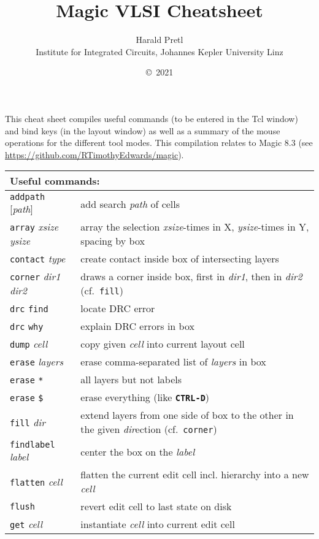 \documentclass[10pt,a4paper]{article}
\author{Harald Pretl\\Institute for Integrated Circuits, Johannes Kepler University Linz}
\title{Magic VLSI Cheatsheet}
\date{\copyright~2021}
\newcommand{\key}[1]{\texttt{\textbf{#1}}}
\newcommand{\mac}[1]{\texttt{#1}}
\newcommand{\argu}[1]{\textit{#1}}
\begin{document}
	\maketitle
	
	This cheat sheet compiles useful commands (to be entered in the Tcl window) and bind keys (in the layout window) as well as a summary of the mouse operations for the different tool modes. This compilation relates to Magic 8.3 (see \url{https://github.com/RTimothyEdwards/magic}).
	
	\newpage

	\begin{tabular}{p{}p{}}
		\toprule
		\multicolumn{2}{l}{Useful commands:}\\
		\midrule
		\mac{addpath} [\argu{path}] & add search \argu{path} of cells\\
		\mac{array} \argu{xsize} \argu{ysize} & array the selection \argu{xsize}-times in X, \argu{ysize}-times in Y, spacing by box\\
		\mac{contact} \argu{type} & create contact inside box of intersecting layers\\
		\mac{corner} \argu{dir1} \argu{dir2} & draws a corner inside box, first in \argu{dir1}, then in \argu{dir2} (cf.~\mac{fill})\\
		\mac{drc} \mac{find} & locate DRC error\\
		\mac{drc} \mac{why} & explain DRC errors in box\\
		\mac{dump} \argu{cell} & copy given \argu{cell} into current layout cell\\
		\mac{erase} \argu{layers} & erase comma-separated list of \argu{layers} in box\\
		\mac{erase} \mac{*} & all layers but not labels\\
		\mac{erase} \mac{\$} & erase everything (like \key{CTRL-D})\\
		\mac{fill} \argu{dir} & extend layers from one side of box to the other in the given \argu{dir}ection (cf.~\mac{corner})\\
		\mac{findlabel} \argu{label} & center the box on the \argu{label}\\
		\mac{flatten} \argu{cell} & flatten the current edit cell incl. hierarchy into a new \argu{cell}\\
		\mac{flush} & revert edit cell to last state on disk\\
		\mac{get} \argu{cell} & instantiate \argu{cell} into current edit cell\\

\end{tabular}
\end{document}
